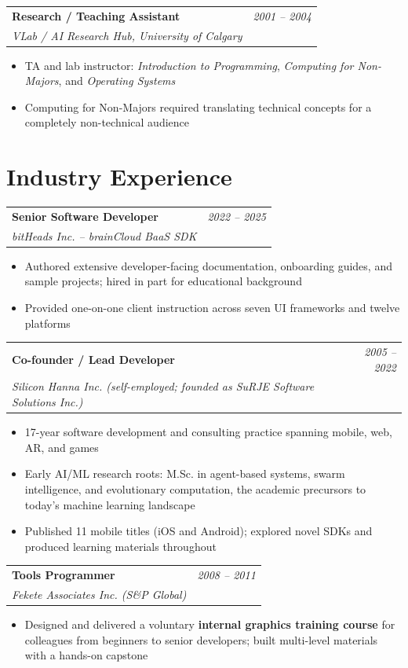 \documentclass[10pt]{article}
\makeatletter
\newcommand{\experience}[4]{%
  \vspace{4pt}
  \begin{tabular*}{\textwidth}{@{}l@{\extracolsep{\fill}}r@{}}
    \textbf{#1} & \textit{#2} \\
    \textit{\small#3} & \textit{\small#4}
  \end{tabular*}
  \vspace{-4pt}
}
\makeatother
\begin{document}
\experience{Research / Teaching Assistant}{2001 -- 2004}{VLab / AI Research Hub, University of Calgary}{}
\begin{itemize}
    \item TA and lab instructor: \textit{Introduction to Programming}, \textit{Computing for Non-Majors}, and \textit{Operating Systems}
    \item Computing for Non-Majors required translating technical concepts for a completely non-technical audience
\end{itemize}

\section*{Industry Experience}

\experience{Senior Software Developer}{2022 -- 2025}{bitHeads Inc. \normalfont\small\textit{-- brainCloud BaaS SDK}}{}
\begin{itemize}
    \item Authored extensive developer-facing documentation, onboarding guides, and sample projects; hired in part for educational background
    \item Provided one-on-one client instruction across seven UI frameworks and twelve platforms
\end{itemize}

\experience{Co-founder / Lead Developer}{2005 -- 2022}{Silicon Hanna Inc. \normalfont\small\textit{(self-employed; founded as SuRJE Software Solutions Inc.)}}{}
\begin{itemize}
    \item 17-year software development and consulting practice spanning mobile, web, AR, and games
    \item Early AI/ML research roots: M.Sc. in agent-based systems, swarm intelligence, and evolutionary computation, the academic precursors to today's machine learning landscape
    \item Published 11 mobile titles (iOS and Android); explored novel SDKs and produced learning materials throughout
\end{itemize}

\experience{Tools Programmer}{2008 -- 2011}{Fekete Associates Inc. (S\&P Global)}{}
\begin{itemize}
    \item Designed and delivered a voluntary \textbf{internal graphics training course} for colleagues from beginners to senior developers; built multi-level materials with a hands-on capstone
\end{itemize}
\end{document}
